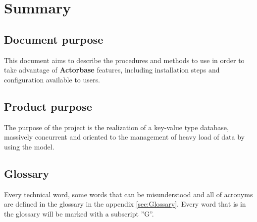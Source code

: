 \documentclass{scalatekids-article}
\begin{document}
\section{Summary}

\subsection{Document purpose}

This document aims to describe the procedures and methods to use in order to take
advantage of \textbf{Actorbase} features, including installation steps and configuration
available to users.

\subsection{Product purpose}

The purpose of the project is the realization of a key-value type
 database, massively concurrent and oriented to the management of heavy load of data by
using the  model.

\subsection{Glossary}
Every technical word, some words that can be misunderstood and all of acronyms are defined in the glossary in the appendix \ref{sec:Glossary}.
Every word that is in the glossary will be marked with a subscript ”G”.





\end{document}
